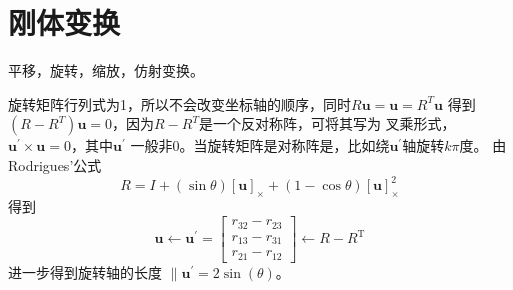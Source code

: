 \documentclass[lang=cn,newtx,10pt,scheme=chinese]{elegantbook}
\begin{document}
\section{刚体变换}
平移，旋转，缩放，仿射变换。

旋转矩阵行列式为1，所以不会改变坐标轴的顺序，同时$R\boldsymbol{u}=\boldsymbol{u}=R^{T}\boldsymbol{u}$
得到$(R-R^T)\boldsymbol{u}=0$，因为$R-R^T$是一个反对称阵，可将其写为
叉乘形式，$\boldsymbol{u^{'}}\times \boldsymbol{u}=0$，其中$\boldsymbol{u^{'}}$
一般非0。当旋转矩阵是对称阵是，比如绕$\boldsymbol{u^{'}}$轴旋转$k\pi$度。
由Rodrigues'公式
\begin{equation}
  R=I+(\sin \theta)[\boldsymbol{u}]_{\times}+(1-\cos \theta)[\boldsymbol{u}]_{\times}^2
\end{equation}
得到
\begin{equation}
  \boldsymbol{u} \leftarrow \boldsymbol{u}^{\prime}=\left[\begin{array}{l}
  r_{32}-r_{23} \\
  r_{13}-r_{31} \\
  r_{21}-r_{12}
  \end{array}\right] \leftarrow R-R^{\mathrm{T}}
\end{equation}
进一步得到旋转轴的长度
$\|\boldsymbol{u^{'}}=2\sin(\theta)$。
\end{document}
